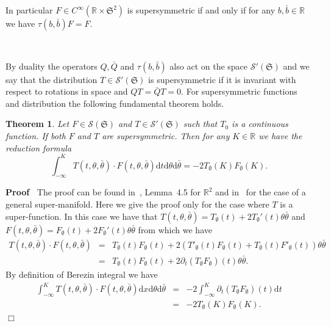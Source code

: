 \documentclass[a4paper,10pt]{article}
\newcommand{\mathd}{\mathrm{d}}
\newenvironment{proof}{\noindent\textbf{Proof\ }}{\hspace*{\fill}$\Box$\medskip}
\newtheorem{theorem}{Theorem}
\begin{document}
In particular $F \in C^{\infty} (\mathbb{R} \times \mathfrak{S}^2)$ is
supersymmetric if and only if for any $b, \bar{b} \in \mathbb{R}$ we have
$\tau (b, \bar{b}) F = F$.

\

By duality the operators $Q, \bar{Q}$ and $\tau (b, \bar{b})$ also act on the
space $\mathcal{S}' (\mathfrak{S})$ and we say that the distribution $T \in
\mathcal{S}' (\mathfrak{S})$ is supersymmetric if it is invariant with respect
to rotations in space and $Q T = \bar{Q} T = 0$. For supersymmetric functions
and distribution the following fundamental theorem holds.

\begin{theorem}
  \label{theorem_supersymmetry1}Let $F \in \mathcal{S} (\mathfrak{S})$ and $T
  \in \mathcal{S}' (\mathfrak{S})$ such that $T_0$ is a continuous function.
  If both $F$ and $T$ are supersymmetric. Then for any $K \in \mathbb{R}$ we
  have the reduction formula
  \begin{equation}
    \int_{- \infty}^K T (t, \theta, \bar{\theta}) \cdot F (t, \theta,
    \bar{\theta}) \mathd t \mathd \theta \mathd \bar{\theta} = - 2
    T_{\emptyset} (K) F_{\emptyset} (K) . \label{eq:key}
  \end{equation}
\end{theorem}

\begin{proof}
  The proof can be found in~{\cite{Klein1984}}, Lemma~4.5 for $\mathbb{R}^2$
  and in~{\cite{Zaboronsky1997}} for the case of a general super-manifold.
  Here we give the proof only for the case where $T$ is a super-function. In
  this case we have that $T (t, \theta, \bar{\theta}) = T_{\emptyset} (t) + 2
  T_{\emptyset}' (t) \theta \bar{\theta}$ and $F (t, \theta, \bar{\theta}) =
  F_{\emptyset} (t) + 2 F_{\emptyset}' (t) \theta \bar{\theta}$ from which we
  have
  \[ \begin{array}{lll}
       T (t, \theta, \bar{\theta}) \cdot F (t, \theta, \bar{\theta}) & = &
       T_{\emptyset} (t) F_{\emptyset} (t) + 2 (T'_{\emptyset} (t)
       F_{\emptyset} (t) + T_{\emptyset} (t) F'_{\emptyset} (t)) \theta
       \bar{\theta}\\
       & = & T_{\emptyset} (t) F_{\emptyset} (t) + 2 \partial_t
       (T_{\emptyset} F_{\emptyset}) (t) \theta \bar{\theta} .
     \end{array} \]
  By definition of Berezin integral we have
  \begin{eqnarray}
    \int_{- \infty}^K T (t, \theta, \bar{\theta}) \cdot F (t, \theta,
    \bar{\theta}) \mathd x \mathd \theta \mathd \bar{\theta} & = & - 2 \int_{-
    \infty}^K \partial_t (T_{\emptyset} F_{\emptyset}) (t) \mathd t
    \nonumber\\
    & = & - 2 T_{\emptyset} (K) F_{\emptyset} (K) . \nonumber
  \end{eqnarray}
\end{proof}
\end{document}
